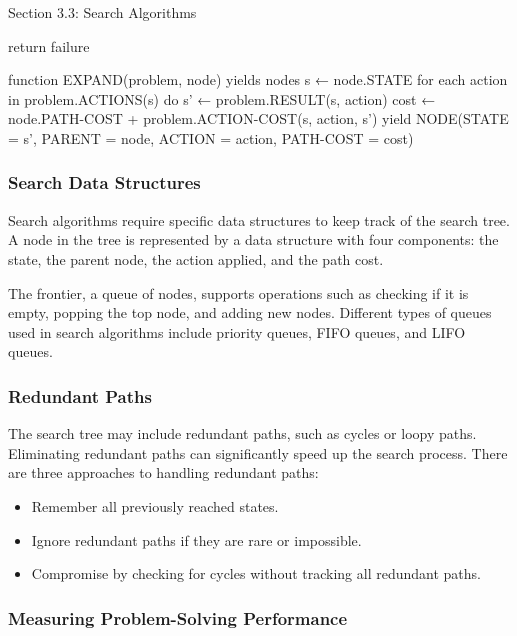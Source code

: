 \begin{notes}{Section 3.3: Search Algorithms}
\begin{highlight}
\begin{code}[Puseudo]
        return failure

    function EXPAND(problem, node) yields nodes
        s ← node.STATE
        for each action in problem.ACTIONS(s) do
            s' ← problem.RESULT(s, action)
            cost ← node.PATH-COST + problem.ACTION-COST(s, action, s')
            yield NODE(STATE = s', PARENT = node, ACTION = action, PATH-COST = cost)
    \end{code}
    \end{highlight}

    \subsubsection*{Search Data Structures}

    Search algorithms require specific data structures to keep track of the search tree. A node in the tree is represented by a data structure with four components: the state, the parent node, the 
    action applied, and the path cost.

    The frontier, a queue of nodes, supports operations such as checking if it is empty, popping the top node, and adding new nodes. Different types of queues used in search algorithms include 
    priority queues, FIFO queues, and LIFO queues.

    \subsubsection*{Redundant Paths}

    The search tree may include redundant paths, such as cycles or loopy paths. Eliminating redundant paths can significantly speed up the search process. There are three approaches to handling redundant paths:
    \begin{itemize}
        \item Remember all previously reached states.
        \item Ignore redundant paths if they are rare or impossible.
        \item Compromise by checking for cycles without tracking all redundant paths.
    \end{itemize}

    \subsubsection*{Measuring Problem-Solving Performance}


\end{notes}
